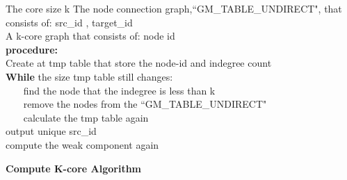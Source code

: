 \begin{algorithm}[h]
The core size k
The node connection graph,``GM\_TABLE\_UNDIRECT", that consists of: src\_id , target\_id \\
A k-core graph that consists of: node id \\
{\bf procedure:} \\
Create at tmp table that store the node-id and indegree count\\
{\bf While} the size tmp table still changes: \\
	~~~ find the node that the indegree is less than k \\
	~~~ remove the nodes from the ``GM\_TABLE\_UNDIRECT" \\
	~~~ calculate the tmp table again \\
output unique src\_id  \\
compute the weak component again  
\caption{{\bf Compute K-core Algorithm} \label{Algorithm}}

\end{algorithm}